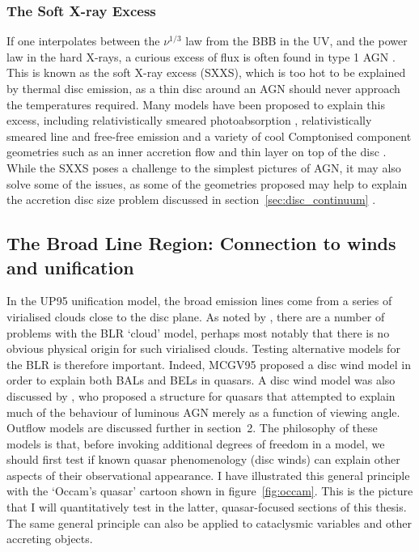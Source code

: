 \subsubsection{The Soft X-ray Excess}
\label{sec:sxxs}

If one interpolates between the $\nu^{1/3}$ law from the BBB in the UV, and the power law
in the hard X-rays, a curious excess of flux is often found
in type 1 AGN \citep[see figure~\ref{fig:quasar_sed}, and][]{koratkar1999}. 
This is known as the soft X-ray excess (SXXS), which is too 
hot to be explained by thermal disc emission, as a thin disc around an AGN should
never approach the temperatures required. Many models have been proposed to
explain this excess, including relativistically smeared 
photoabsorption \citep{gierlinskidone2004b,gierlinskidone2006}, 
relativistically smeared line and free-free emission \citep{rossfabian2005} 
and a variety of cool Comptonised component geometries such as an 
inner accretion flow \citep{magdiarz1998,done2012} 
and thin layer on top of the disc \citep{januik2001}. 
While the SXXS poses a challenge to
the simplest pictures of AGN, it may also solve some of the issues, as
some of the geometries proposed may help to explain the 
accretion disc size problem discussed in 
section~\ref{sec:disc_continuum} \citep{gardnerdone2016}.

\subsection{The Broad Line Region: Connection to winds and unification}

In the UP95 unification model, the broad emission lines
come from a series of virialised clouds close to the disc plane.
As noted by \cite[][hereafter MCGV95]{MCGV95}, there are a number of problems with
the BLR `cloud' model, perhaps most notably that there is no obvious 
physical origin for such virialised clouds. 
Testing alternative models for the BLR is therefore important.
Indeed, MCGV95 proposed a disc wind model in order to explain both BALs and BELs
in quasars. A disc wind model was also  discussed by \cite{elvis2000}, 
who proposed a structure for quasars that attempted to explain much 
of the behaviour of luminous AGN
merely as a function of viewing angle. Outflow models are discussed further in section~2.
The philosophy of these models is that, before invoking additional
degrees of freedom in a model, we should first test if known quasar phenomenology 
(disc winds) can explain other aspects of their observational appearance.
I have illustrated this general principle with the `Occam's quasar' 
cartoon shown in figure~\ref{fig:occam}. This is the picture that I will
quantitatively test in the latter, quasar-focused sections of this thesis.
The same general principle can also be applied to cataclysmic variables 
and other accreting objects.


